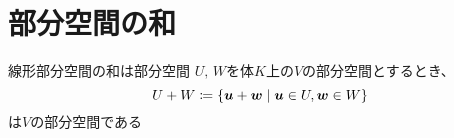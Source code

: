 \documentclass[../../../topic_linear-algebra]{subfiles}
\begin{document}
\sectionline
\section{部分空間の和}

\begin{mindflow}
\end{mindflow}

\begin{theorem*}{線形部分空間の和は部分空間}
  $U,\,W$を体$K$上の$V$の部分空間とするとき、
  \begin{equation*}
    U + W \coloneq \{ \vb*{u} + \vb*{w} \mid \vb*{u} \in U, \vb*{w} \in W \}
  \end{equation*}
  は$V$の部分空間である
\end{theorem*}
\end{document}
